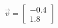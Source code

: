 \documentclass[preview]{standalone}
\begin{document}
\begin{align*}
\vec{v}=\begin{bmatrix}-0.4\\1.8\end{bmatrix}
\end{align*}
\end{document}
